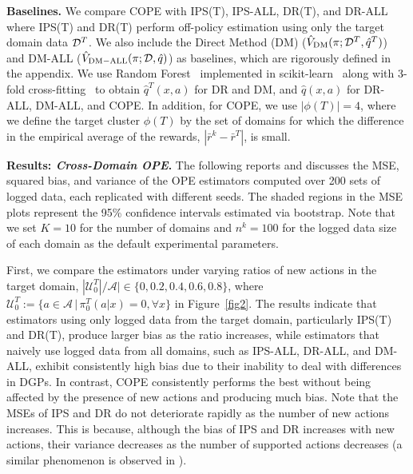 \documentclass{article} %
\theoremstyle{definition}
\begin{document}
\textbf{Baselines.} We compare COPE with IPS(T), IPS-ALL, DR(T), and DR-ALL where IPS(T) and DR(T) perform off-policy estimation using only the target domain data $\mathcal{D}^T$. We also include the Direct Method (DM) ($\hat{V}_{\rm{DM}}(\pi;\mathcal{D}^T, \hat{q}^T)$) and DM-ALL ($\hat{V}_{\rm{DM-ALL}}(\pi;\mathcal{D}, \hat{q})$) as baselines, which are rigorously defined in the appendix. We use Random Forest~\citep{breiman2001random} implemented in scikit-learn~\citep{pedregosa2011scikit} along with 3-fold cross-fitting~\citep{newey2018cross} to obtain $\hat{q}^T(x, a)$ for DR and DM, and $\hat{q}(x,a)$ for DR-ALL, DM-ALL, and COPE. In addition, for COPE, we use $|\phi(T)|=4$, where we define the target cluster $\phi(T)$ by the set of domains for which the difference in the empirical average of the rewards, $|\bar{r}^k - \bar{r}^T|$, is small.

\textbf{Results: \textit{Cross-Domain OPE}.}
The following reports and discusses the MSE, squared bias, and variance of the OPE estimators computed over 200 sets of logged data, each replicated with different seeds. The shaded regions in the MSE plots represent the 95\% confidence intervals estimated via bootstrap. Note that we set $K = 10$ for the number of domains and $n^{k}=100$ for the logged data size of each domain as the default experimental parameters.

First, we compare the estimators under varying ratios of new actions in the target domain, $|\mathcal{U}_0^T|/\mathcal{A}| \in \{0, 0.2, 0.4, 0.6, 0.8\}$, where $\mathcal{U}_0^T:=\{a\in\mathcal{A} \,|\, \pi_0^T(a|x)=0, \forall x\}$ in Figure~\ref{fig2}. The results indicate that estimators using only logged data from the target domain, particularly IPS(T) and DR(T), produce larger bias as the ratio increases, while estimators that naively use logged data from all domains, such as IPS-ALL, DR-ALL, and DM-ALL, exhibit consistently high bias due to their inability to deal with differences in DGPs. In contrast, COPE consistently performs the best without being affected by the presence of new actions and producing much bias. Note that the MSEs of IPS and DR do not deteriorate rapidly as the number of new actions increases. This is because, although the bias of IPS and DR increases with new actions, their variance decreases as the number of supported actions decreases (a similar phenomenon is observed in \cite{saito2022off}).
\end{document}
